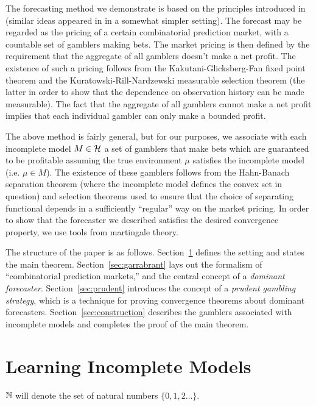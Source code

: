 The forecasting method we demonstrate is based on the principles introduced in \cite{Garrabrant_2016} (similar ideas appeared in \cite{Vovk_2005} in a somewhat simpler setting). The forecast may be regarded as the pricing of a certain combinatorial prediction market, with a countable set of gamblers making bets. The market pricing is then defined by the requirement that the aggregate of all gamblers doesn't make a net profit. The existence of such a pricing follows from the Kakutani-Glicksberg-Fan fixed point theorem and the Kuratowski-Rill-Nardzewski measurable selection theorem (the latter in order to show that the dependence on observation history can be made measurable). The fact that the aggregate of all gamblers cannot make a net profit implies that each individual gambler can only make a bounded profit.

The above method is fairly general, but for our purposes, we associate with each incomplete model $M \in \mathcal{H}$ a set of gamblers that make bets which are guaranteed to be profitable assuming the true environment $\mu$ satisfies the incomplete model (i.e. $\mu \in M$). The existence of these gamblers follows from the Hahn-Banach separation theorem (where the incomplete model defines the convex set in question) and selection theorems used to ensure that the choice of separating functional depends in a sufficiently \enquote{regular} way on the market pricing. In order to show that the forecaster we described satisfies the desired convergence property, we use tools from martingale theory.

The structure of the paper is as follows. Section~\ref{sec:learning} defines the setting and states the main theorem. Section~\ref{sec:garrabrant} lays out the formalism of \enquote{combinatorial prediction markets,} and the central concept of a \emph{dominant forecaster}. Section~\ref{sec:prudent} introduces the concept of a \emph{prudent gambling strategy}, which is a technique for proving convergence theorems about dominant forecasters. Section~\ref{sec:construction} describes the gamblers associated with incomplete models and completes the proof of the main theorem.

\section{Learning Incomplete Models}
\label{sec:learning}

$\mathbb{N}$ will denote the set of natural numbers $\{0, 1, 2 \ldots\}$.


